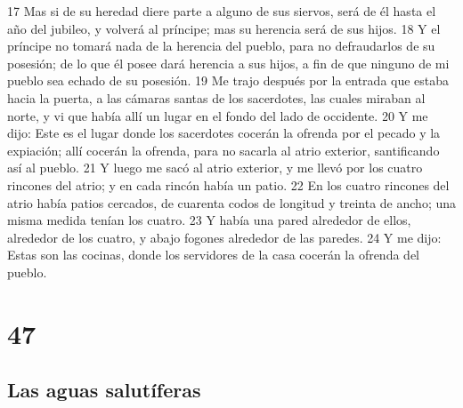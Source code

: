 17 Mas si de su heredad diere parte a alguno de sus siervos, será de él hasta el año del jubileo, y volverá al príncipe; mas su herencia será de sus hijos.
18 Y el príncipe no tomará nada de la herencia del pueblo, para no defraudarlos de su posesión; de lo que él posee dará herencia a sus hijos, a fin de que ninguno de mi pueblo sea echado de su posesión.
19 Me trajo después por la entrada que estaba hacia la puerta, a las cámaras santas de los sacerdotes, las cuales miraban al norte, y vi que había allí un lugar en el fondo del lado de occidente.
20 Y me dijo: Este es el lugar donde los sacerdotes cocerán la ofrenda por el pecado y la expiación; allí cocerán la ofrenda, para no sacarla al atrio exterior, santificando así al pueblo.
21 Y luego me sacó al atrio exterior, y me llevó por los cuatro rincones del atrio; y en cada rincón había un patio.
22 En los cuatro rincones del atrio había patios cercados, de cuarenta codos de longitud y treinta de ancho; una misma medida tenían los cuatro.
23 Y había una pared alrededor de ellos, alrededor de los cuatro, y abajo fogones alrededor de las paredes.
24 Y me dijo: Estas son las cocinas, donde los servidores de la casa cocerán la ofrenda del pueblo.

\chapter{47}

\section*{Las aguas salutíferas}

